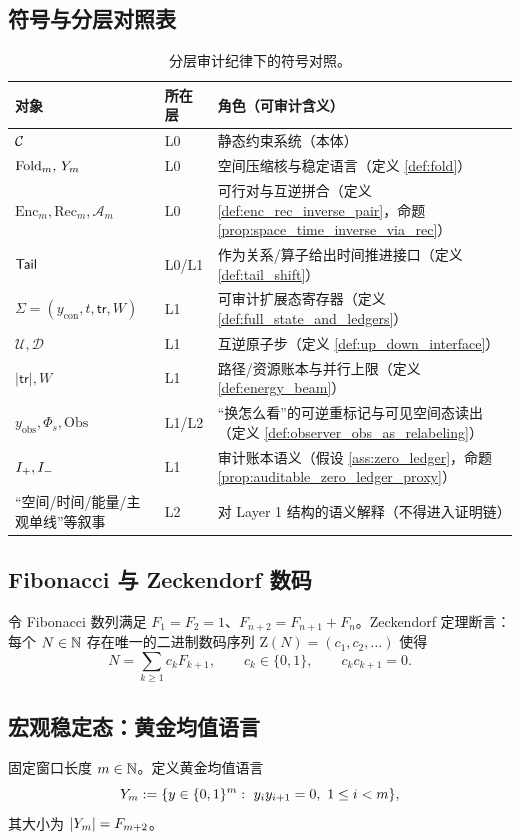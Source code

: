 \subsection{符号与分层对照表}\label{subsec:layer_symbol_table}
\begin{table}[H]
\centering
\small
\setlength{\tabcolsep}{6pt}
\begin{tabular}{l l l}
\toprule
\textbf{对象} & \textbf{所在层} & \textbf{角色（可审计含义）}\\
\midrule
\(\mathcal{C}\) & L0 & 静态约束系统（本体）\\
\(\mathrm{Fold}_m,\,Y_m\) & L0 & 空间压缩核与稳定语言（定义 \ref{def:fold}）\\
\(\mathrm{Enc}_m,\mathrm{Rec}_m,\mathcal A_m\) & L0 & 可行对与互逆拼合（定义 \ref{def:enc_rec_inverse_pair}，命题 \ref{prop:space_time_inverse_via_rec}）\\
\(\mathsf{Tail}\) & L0/L1 & 作为关系/算子给出时间推进接口（定义 \ref{def:tail_shift}）\\
\(\Sigma=(y_{\mathrm{con}},t,\mathsf{tr},W)\) & L1 & 可审计扩展态寄存器（定义 \ref{def:full_state_and_ledgers}）\\
\(\mathcal U,\mathcal D\) & L1 & 互逆原子步（定义 \ref{def:up_down_interface}）\\
\(|\mathsf{tr}|,W\) & L1 & 路径/资源账本与并行上限（定义 \ref{def:energy_beam}）\\
\(y_{\mathrm{obs}},\Phi_s,\mathrm{Obs}\) & L1/L2 & “换怎么看”的可逆重标记与可见空间态读出（定义 \ref{def:observer_obs_as_relabeling}）\\
\(I_{+},I_{-}\) & L1 & 审计账本语义（假设 \ref{ass:zero_ledger}，命题 \ref{prop:auditable_zero_ledger_proxy}）\\
“空间/时间/能量/主观单线”等叙事 & L2 & 对 Layer 1 结构的语义解释（不得进入证明链）\\
\bottomrule
\end{tabular}
\caption{分层审计纪律下的符号对照。}\label{tab:layer_symbol_table}
\end{table}

\subsection{Fibonacci 与 Zeckendorf 数码}
令 Fibonacci 数列满足 \(F_1=F_2=1\)、\(F_{n+2}=F_{n+1}+F_n\)。Zeckendorf 定理断言：每个 \(N\in\mathbb{N}\) 存在唯一的二进制数码序列 \(\mathrm Z(N)=(c_1,c_2,\dots)\) 使得
$$
N=\sum_{k\ge 1} c_k F_{k+1},\qquad c_k\in\{0,1\},\qquad c_kc_{k+1}=0.
$$

\subsection{宏观稳定态：黄金均值语言}
固定窗口长度 \(m\in\mathbb{N}\)。定义黄金均值语言
$$
Y_m:=\{y\in\{0,1\}^m:\ y_i y_{i+1}=0,\ 1\le i<m\},
$$
其大小为 \(|Y_m|=F_{m+2}\)。

